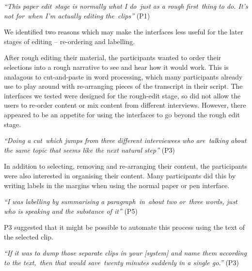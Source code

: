 \textit{``This paper edit stage is normally what I do just as a rough first thing to do. It's not for when I'm actually
editing the clips''} (P1)

We identified two reasons which may make the interfaces less useful for the later stages of editing -- re-ordering and
labelling.


After rough editing their material, the participants wanted to order their selections into a rough narrative to see and
hear how it would work. This is analagous to cut-and-paste in word processing, which many participants already use to
play around with re-arranging pieces of the transcript in their script. The interfaces we tested were designed for the
rough-edit stage, so did not allow the users to re-order content or mix content from different interviews. However,
there appeared to be an appetite for using the interfaces to go beyond the rough edit stage.

\textit{``Doing a cut which jumps from three different interviewees who are talking about the same topic that seems
like the next natural step''} (P3)


In addition to selecting, removing and re-arranging their content, the participants were also interested in organising
their content.
Many participants did this by writing labels in the margins when using the normal paper or pen interface.

\textit{``I was labelling by summarising a paragraph in about two or three words, just who is speaking and the
substance of it''} (P5)

P3 suggested that it might be possible to automate this process using the text of the selected clip.


\textit{``If it was to dump those separate clips in your [system] and name them according to the text, then that would
save twenty minutes suddenly in a single go.''} (P3)


